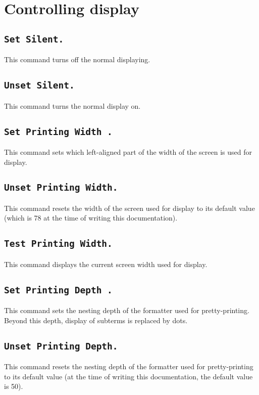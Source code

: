 \section{Controlling display}

\subsection[\tt Set Silent.]{\tt Set Silent.
\label{Begin-Silent}
}
This command turns off the normal displaying.

\subsection[\tt Unset Silent.]{\tt Unset Silent.}
This command turns the normal display on.

\subsection[\tt Set Printing Width {\integer}.]{\tt Set Printing Width {\integer}.}
This command sets which left-aligned part of the width of the screen
is used for display. 

\subsection[\tt Unset Printing Width.]{\tt Unset Printing Width.}
This command resets the width of the screen used for display to its
default value (which is 78 at the time of writing this documentation).

\subsection[\tt Test Printing Width.]{\tt Test Printing Width.}
This command displays the current screen width used for display.

\subsection[\tt Set Printing Depth {\integer}.]{\tt Set Printing Depth {\integer}.}
This command sets the nesting depth of the formatter used for
pretty-printing. Beyond this depth, display of subterms is replaced by
dots. 

\subsection[\tt Unset Printing Depth.]{\tt Unset Printing Depth.}
This command resets the nesting depth of the formatter used for
pretty-printing to its default value (at the
time of writing this documentation, the default value is 50).

